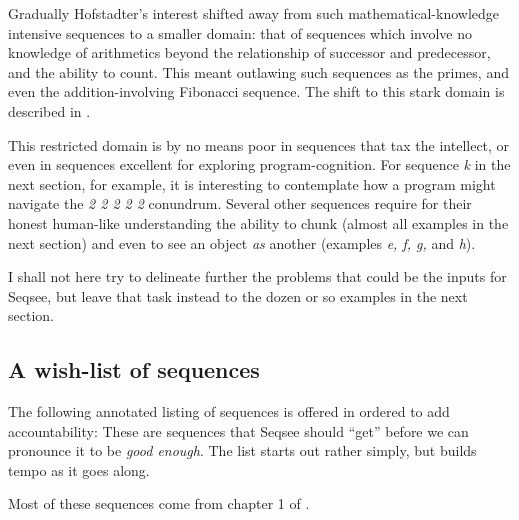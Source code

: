 \documentclass[letterpaper]{article}
\begin{document}
Gradually Hofstadter's interest shifted away from such mathematical-knowledge intensive sequences to a smaller domain: that of sequences which involve no knowledge of arithmetics beyond the relationship of successor and predecessor, and the ability to count. This meant outlawing such sequences as the primes, and even the addition-involving Fibonacci sequence. The shift to this stark domain is described in .

This restricted domain is by no means poor in sequences that tax the intellect, or even in sequences excellent for exploring program-cognition. For sequence \emph{k} in the next section, for example, it is interesting to contemplate how a program might navigate the \emph{2 2 2 2 2} conundrum. Several other sequences require for their honest human-like understanding the ability to chunk (almost all examples in the next section) and even to see an object \emph{as} another (examples \emph{e, f, g, } and \emph{h}).

I shall not here try to delineate further the problems that could be the inputs for Seqsee, but leave that task instead to the dozen or so examples in the next section.

\subsection{A wish-list of sequences}
\label{sec:list}

The following annotated listing of sequences is offered in ordered to add accountability: These are sequences that Seqsee should ``get'' before we can pronounce it to be \emph{good enough}. The list starts out rather simply, but builds tempo as it goes along.

Most of these sequences come from chapter 1 of .
\end{document}
